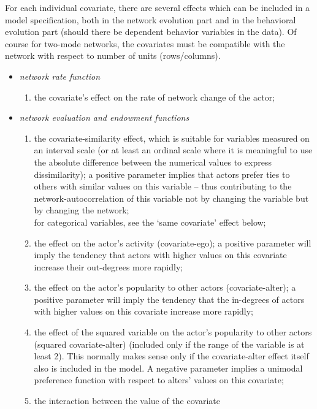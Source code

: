 \documentclass[a4paper,fleqn]{article}
\newcommand{\+}{\, + \,}
\begin{document}
{For each individual covariate, there are several effects which
can be included in a model specification, both in the network
evolution part and in the behavioral evolution part (should there be
dependent behavior variables in the data).
Of course for two-mode networks, the covariates must be compatible
with the network with respect to number of units (rows/columns).
\begin{itemize}
\item {\em network rate function}
\begin{enumerate}
\item the covariate's effect on the rate of network change of the
actor;
\end{enumerate}
\item {\em network evaluation and endowment functions}
\begin{enumerate}
\item the covariate-similarity effect, which is suitable for variables
      measured on an interval scale (or at least an ordinal scale
      where it is meaningful to use the absolute difference
      between the numerical values to express dissimilarity);
      a positive parameter implies that actors prefer
      ties to others with similar values on this variable --
      thus contributing to the
      network-autocorrelation of this variable not by changing
      the variable but by changing the network;\\
      for categorical variables, see the `same covariate'
      effect below;
\item the effect on the actor's activity (covariate-ego);
      a positive parameter will imply the tendency that
      actors with higher values on this covariate
      increase their out-degrees more rapidly;
\item the effect on the actor's popularity to other actors (covariate-alter);
      a positive parameter will imply the tendency that
      the in-degrees of actors with higher values on this covariate
      increase more rapidly;
\item the effect of the squared variable
      on the actor's popularity to other actors (squared covariate-alter)
      (included only if the range of the variable is at least 2).
      This normally makes sense only if the covariate-alter effect
      itself also is included in the model.
      A negative parameter implies a unimodal preference
      function with respect to alters' values on this covariate;
\item the interaction between the value of the covariate

\end{enumerate}
\end{itemize}}
\end{document}
